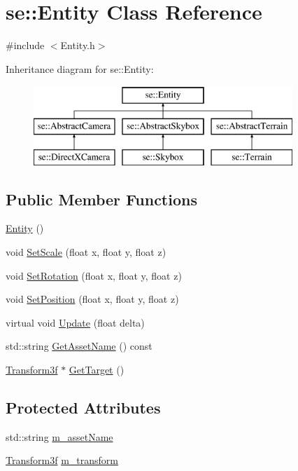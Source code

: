 \hypertarget{classse_1_1_entity}{}\section{se\+:\+:Entity Class Reference}
\label{classse_1_1_entity}


{\ttfamily \#include $<$Entity.\+h$>$}

Inheritance diagram for se\+:\+:Entity\+:\begin{figure}[H]
\begin{center}
\leavevmode
\includegraphics[height=3.000000cm]{classse_1_1_entity}
\end{center}
\end{figure}
\subsection*{Public Member Functions}
\begin{DoxyCompactItemize}
\item 
\mbox{\hyperlink{classse_1_1_entity_ac92492302d50c22ba7c4e9ff016b6145}{Entity}} ()
\item 
void \mbox{\hyperlink{classse_1_1_entity_a812b63adcbf5f1a3e429a31c6e0ff940}{Set\+Scale}} (float x, float y, float z)
\item 
void \mbox{\hyperlink{classse_1_1_entity_a41f820b99b2b6d76c97472dcddca7fa2}{Set\+Rotation}} (float x, float y, float z)
\item 
void \mbox{\hyperlink{classse_1_1_entity_a09e198e70620f231106d9f375f7598f3}{Set\+Position}} (float x, float y, float z)
\item 
virtual void \mbox{\hyperlink{classse_1_1_entity_a1cd277c4c5a517f5cde8b72d5c40a8f0}{Update}} (float delta)
\item 
std\+::string \mbox{\hyperlink{classse_1_1_entity_af1d512cba984ffe167decd7ecf7a88f4}{Get\+Asset\+Name}} () const
\item 
\mbox{\hyperlink{classse_1_1_transform3f}{Transform3f}} $\ast$ \mbox{\hyperlink{classse_1_1_entity_a677f32cd82e63f814b4be91518263242}{Get\+Target}} ()
\end{DoxyCompactItemize}
\subsection*{Protected Attributes}
\begin{DoxyCompactItemize}
\item 
std\+::string \mbox{\hyperlink{classse_1_1_entity_aba1f7cc3700caee65b20c423185ab7ca}{m\+\_\+asset\+Name}}
\item 
\mbox{\hyperlink{classse_1_1_transform3f}{Transform3f}} \mbox{\hyperlink{classse_1_1_entity_a85a408963ce0920c7bc3bfec29266238}{m\+\_\+transform}}
\end{DoxyCompactItemize}


